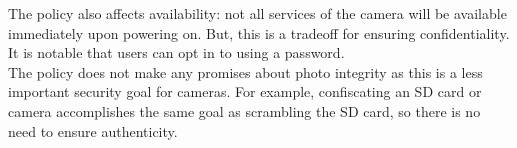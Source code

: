 \documentclass{article}
\begin{document}
\begin{homeworkProblem}[1]
      The policy also affects availability: not all services of the camera will be available immediately upon powering on. But, this is a tradeoff for ensuring confidentiality. It is notable that users can opt in to using a password. \\

      The policy does not make any promises about photo integrity as this is a less important security goal for cameras. For example, confiscating an SD card or camera accomplishes the same goal as scrambling the SD card, so there is no need to ensure authenticity.
  \end{homeworkProblem}
\end{document}
